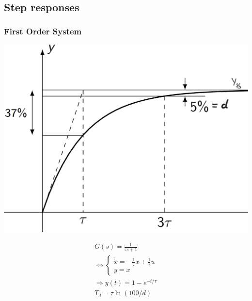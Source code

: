 \subsection{Step responses}
    \subsubsection{First Order System}
    \begin{minipage}{0.59\linewidth}
        \includegraphics[width = \linewidth]{src/images/first_order_step_response.png}
    \end{minipage}
    \begin{minipage}{0.39\linewidth}
        \begin{align*}
            G(s) = \frac{1}{\tau s + 1}\\
            \Leftrightarrow 
            \begin{cases*}
                \dot{x} = -\frac{1}{\tau} x + \frac{1}{\tau} u\\
                y = x
            \end{cases*}\\
            \Rightarrow y(t) = 1-e^{-t/\tau}\\
            T_d = \tau \ln(100/d)
        \end{align*}
    \end{minipage}

